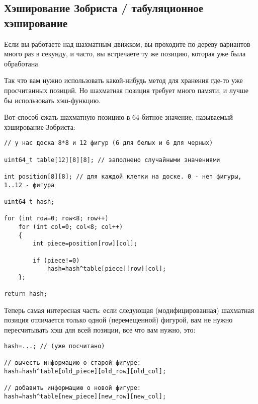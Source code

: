 ﻿\subsection{Хэширование Зобриста / табуляционное хэширование}

Если вы работаете над шахматным движком, вы проходите по дереву вариантов много раз в секунду, и часто, вы встречаете
ту же позицию, которая уже была обработана.

Так что вам нужно использовать какой-нибудь метод для хранения где-то уже просчитанных позиций.
Но шахматная позиция требует много памяти, и лучше бы использовать хэш-функцию.

Вот способ сжать шахматную позицию в 64-битное значение, называемый хэширование Зобриста:

\begin{lstlisting}[style=customc]
// у нас доска 8*8 и 12 фигур (6 для белых и 6 для черных)

uint64_t table[12][8][8]; // заполнено случайными значениями

int position[8][8]; // для каждой клетки на доске. 0 - нет фигуры, 1..12 - фигура

uint64_t hash;

for (int row=0; row<8; row++)
	for (int col=0; col<8; col++)
	{
		int piece=position[row][col];

		if (piece!=0)
			hash=hash^table[piece][row][col];
	};

return hash;
\end{lstlisting}

Теперь самая интересная часть: если следующая (модифицированная) шахматная позиция отличается только одной (перемещенной)
фигурой, вам не нужно пересчитывать хэш для всей позиции, все что вам нужно, это:

\begin{lstlisting}[style=customc]
hash=...; // (уже посчитано)

// вычесть информацию о старой фигуре:
hash=hash^table[old_piece][old_row][old_col];

// добавить информацию о новой фигуре:
hash=hash^table[new_piece][new_row][new_col];
\end{lstlisting}

